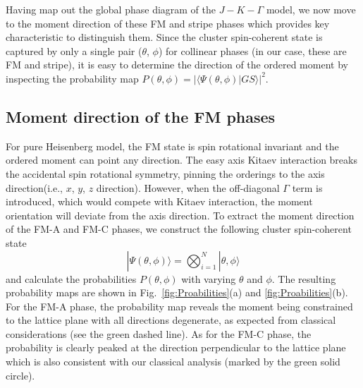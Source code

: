 \documentclass[aps,prb,reprint,amsfonts,amsmath,amssymb,showpacs,groupedaddress,superscriptaddress]{revtex4-1}
\begin{document}
Having map out the global phase diagram of the $J-K-\Gamma$ model, we now move to the moment direction of these FM and stripe phases which provides key characteristic to distinguish them. Since the cluster spin-coherent state is captured by only a single pair ($\theta$, $\phi$) for collinear phases (in our case, these are FM and stripe), it is easy to determine the direction of the ordered moment by inspecting the probability map $P(\theta, \phi) = | \langle \Psi (\theta, \phi) | GS \rangle |^2$.

\subsection{\label{sec:SectionVA}Moment direction of the FM phases}
For pure Heisenberg model, the FM state is spin rotational invariant and the ordered moment can point any direction. The easy axis Kitaev interaction breaks the accidental spin rotational symmetry, pinning the orderings to the axis direction(i.e., $x$, $y$, $z$ direction). However, when the off-diagonal $\Gamma$ term is introduced, which would compete with Kitaev interaction, the moment orientation will deviate from the axis direction. To extract the moment direction of the FM-A and FM-C phases, we construct the following cluster spin-coherent state
\begin{equation}
    |\Psi(\theta, \phi) \rangle = \bigotimes_{i=1}^N|\theta,\phi \rangle
\end{equation}
and calculate the probabilities $P(\theta, \phi)$ with varying $\theta$ and $\phi$. The resulting probability maps are shown in Fig.~\ref{fig:Proabilities}(a) and \ref{fig:Proabilities}(b). For the FM-A phase, the probability map reveals the moment being constrained to the lattice plane with all directions degenerate, as expected from classical considerations (see the green dashed line). As for the FM-C phase, the probability is clearly peaked at the direction perpendicular to the lattice plane which is also consistent with our classical analysis (marked by the green solid circle).
\end{document}
